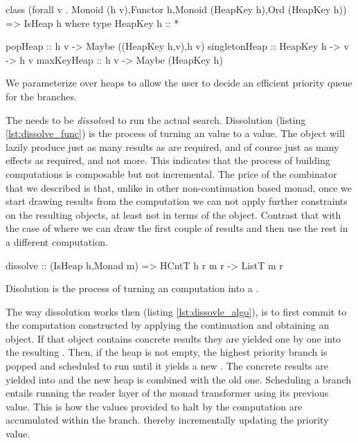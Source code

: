 \begin{code}
\begin{haskellcode}
class (forall v . Monoid (h v),Functor h,Monoid (HeapKey h),Ord (HeapKey h))
  => IsHeap h where
  type HeapKey h :: *

  popHeap :: h v -> Maybe ((HeapKey h,v),h v)
  singletonHeap :: HeapKey h -> v -> h v
  maxKeyHeap :: h v -> Maybe (HeapKey h)
\end{haskellcode}

  \caption{\label{lst:heap_def} We parameterize over heaps to allow
    the user to decide an efficient priority queue for the branches.}
\end{code}

The  needs to be \emph{dissolve}d to run the actual
search. Dissolution (listing \ref{lst:dissolve_func}) is the process
of turning an  value to a  value. The
 object will lazily produce just as many results as are
required, and of course just as many effects as required, and not
more. This indicates that the process of building computations is
composable but not incremental. The price of the \hask{<//>}
combinator that we described is that, unlike in other non-continuation
based monad, once we start drawing results from the computation we can
not apply further constraints on the resulting objects, at least not
in terms of the  object.  Contrast that with the case of
 where we can draw the first couple of results and then
use the rest in a different computation.

\begin{code}
\begin{haskellcode}
dissolve :: (IsHeap h,Monad m) => HCntT h r m r -> ListT m r
\end{haskellcode}
  \caption{\label{lst:dissolve_func}Disolution is the process of
    turning an  computation into a .}
\end{code}

The way dissolution works then (listing \ref{lst:dissovle_algo}), is to first
commit to the computation constructed by applying the continuation and
obtaining an  object. If that object contains concrete results they are
yielded one by one into the resulting .
Then, if the heap is not empty, the highest priority branch is popped and scheduled to run until it yields
a new . The concrete results are yielded into  and the
new heap is combined with the old one. Scheduling a branch entails
running the reader layer of the monad transformer using its previous
value. This is how the values provided to halt by the computation are accumulated within the branch.
thereby incrementally updating the priority value.

